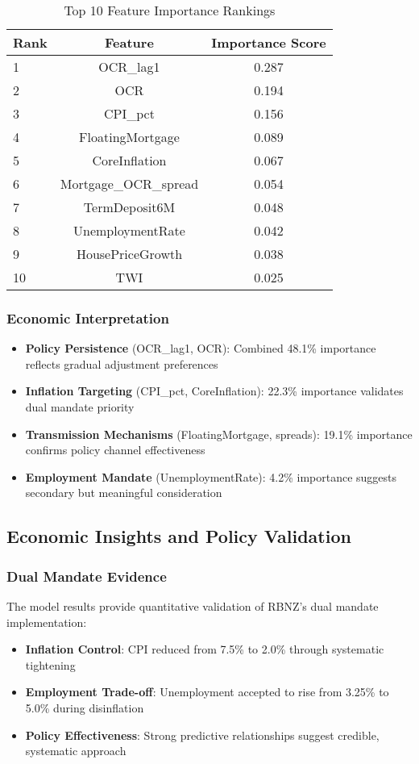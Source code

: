 \documentclass[11pt,a4paper]{article}
\begin{document}
	\begin{table}[H]
		\centering
		\caption{Top 10 Feature Importance Rankings}
		\begin{tabular}{lcc}
			\toprule
			Rank & Feature & Importance Score \\
			\midrule
			1 & OCR\_lag1 & 0.287 \\
			2 & OCR & 0.194 \\
			3 & CPI\_pct & 0.156 \\
			4 & FloatingMortgage & 0.089 \\
			5 & CoreInflation & 0.067 \\
			6 & Mortgage\_OCR\_spread & 0.054 \\
			7 & TermDeposit6M & 0.048 \\
			8 & UnemploymentRate & 0.042 \\
			9 & HousePriceGrowth & 0.038 \\
			10 & TWI & 0.025 \\
			\bottomrule
		\end{tabular}
	\end{table}
	
	\subsubsection{Economic Interpretation}
	\begin{itemize}
		\item \textbf{Policy Persistence} (OCR\_lag1, OCR): Combined 48.1\% importance reflects gradual adjustment preferences
		\item \textbf{Inflation Targeting} (CPI\_pct, CoreInflation): 22.3\% importance validates dual mandate priority
		\item \textbf{Transmission Mechanisms} (FloatingMortgage, spreads): 19.1\% importance confirms policy channel effectiveness
		\item \textbf{Employment Mandate} (UnemploymentRate): 4.2\% importance suggests secondary but meaningful consideration
	\end{itemize}
	
	\subsection{Economic Insights and Policy Validation}
	
	\subsubsection{Dual Mandate Evidence}
	The model results provide quantitative validation of RBNZ's dual mandate implementation:
	\begin{itemize}
		\item \textbf{Inflation Control}: CPI reduced from 7.5\% to 2.0\% through systematic tightening
		\item \textbf{Employment Trade-off}: Unemployment accepted to rise from 3.25\% to 5.0\% during disinflation
		\item \textbf{Policy Effectiveness}: Strong predictive relationships suggest credible, systematic approach
	\end{itemize}
	
\end{document}
